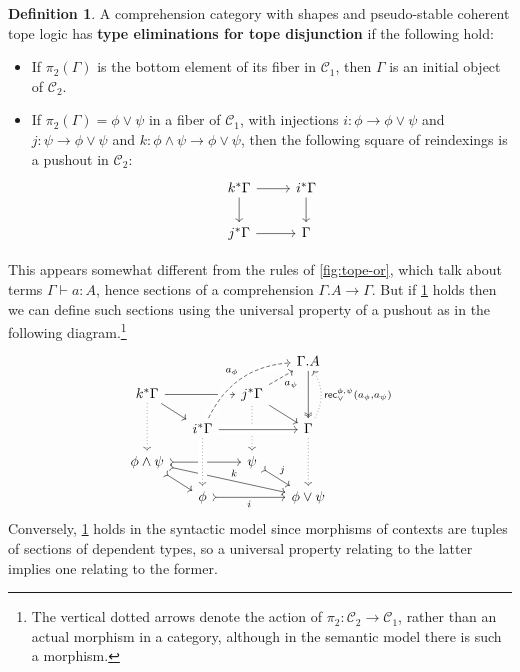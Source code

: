 \documentclass[12pt]{amsart}
\theoremstyle{plain}
\theoremstyle{definition}
\newtheorem{defn}[thm]{Definition}
\theoremstyle{remark}
\numberwithin{equation}{section}
\newcommand{\types}{\vdash}
\newcommand{\rec}{\mathsf{rec}}
\newcommand{\C}{\mathcal{C}}
\begin{document}
\begin{defn}\label{defn:cc-reclor}
  A comprehension category with shapes and pseudo-stable coherent tope logic has \textbf{type eliminations for tope disjunction} if the following hold:
  \begin{itemize}
  \item If $\pi_2(\Gamma)$ is the bottom element of its fiber in $\C_1$, then $\Gamma$ is an initial object of $\C_2$.
  \item If $\pi_2(\Gamma) = \phi\lor\psi$ in a fiber of $\C_1$, with injections $i:\phi\to\phi\lor\psi$ and $j:\psi\to\phi\lor\psi$ and $k:\phi\land\psi\to\phi\lor\psi$, then the following square of reindexings is a pushout in $\C_2$:
    \[
    \begin{tikzcd}
      k^*\Gamma \ar[r] \ar[d] & i^*\Gamma \ar[d] \\ j^*\Gamma \ar[r] & \Gamma
    \end{tikzcd}
    \]
  \end{itemize}
\end{defn}

This appears somewhat different from the rules of \cref{fig:tope-or}, which talk about terms $\Gamma\types a:A$, hence sections of a comprehension $\Gamma.A\to \Gamma$.
But if \cref{defn:cc-reclor} holds then we can define such sections using the universal property of a pushout as in the following diagram.\footnote{The vertical dotted arrows denote the action of $\pi_2 : \C_2\to \C_1$, rather than an actual morphism in a category, although in the semantic model there is such a morphism.}
\[
\begin{tikzcd}[row sep=small,column sep=small]
& & & \Gamma.A \arrow[dd, two heads] \\ 
k^*\Gamma \arrow[rr] \arrow[dr] \arrow[dd, dotted] & & j^*\Gamma \arrow[dr] \arrow[ur, dashed, "a_\psi"'] \arrow[dd,dotted] \\ & i^*\Gamma \arrow[rr, crossing over] \arrow[uurr, bend left, crossing over, dashed, "a_\phi"] & & \Gamma \arrow[dd,dotted] \arrow[uu, bend right, dotted, "{\rec_\lor^{\phi,\psi}(a_\phi,a_\psi)}"'] \\ 
{\phi\land \psi} \arrow[rr, tail] \arrow[dr, tail] \arrow[drrr, tail, "k"] & & {\psi} \arrow[dr, tail, "j"]  \\ 
& {\phi} \arrow[rr, tail, "i"'] \arrow[from=uu, dotted, crossing over] & & {\phi \lor \psi}
\end{tikzcd}
\]
Conversely, \cref{defn:cc-reclor} holds in the syntactic model since morphisms of contexts are tuples of sections of dependent types, so a universal property relating to the latter implies one relating to the former.
\end{document}
